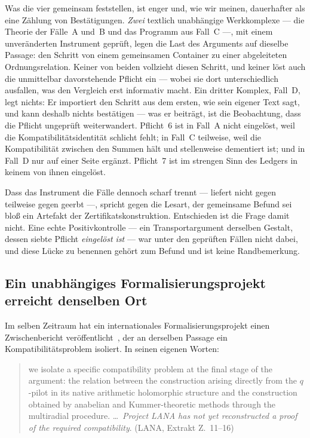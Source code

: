 \documentclass[11pt,a4paper]{article}
\theoremstyle{definition}
\newcommand{\anchor}[2]{(#1, Extrakt Z.~#2)}
\begin{document}
Was die vier gemeinsam feststellen, ist enger und, wie wir meinen, dauerhafter als
eine Zählung von Bestätigungen. \emph{Zwei} textlich unabhängige Werkkomplexe ---
die Theorie der Fälle~A und~B und das Programm aus Fall~C ---, mit einem
unveränderten Instrument geprüft, legen die Last des Arguments auf dieselbe
Passage: den Schritt von einem gemeinsamen Container zu einer abgeleiteten
Ordnungsrelation. Keiner von beiden vollzieht diesen Schritt, und keiner löst auch
die unmittelbar davorstehende Pflicht ein --- wobei sie dort unterschiedlich
ausfallen, was den Vergleich erst informativ macht. Ein dritter Komplex,
Fall~D, legt nichts: Er importiert den Schritt aus dem ersten, wie sein eigener
Text sagt, und kann deshalb nichts bestätigen --- was er beiträgt, ist die
Beobachtung, dass die Pflicht ungeprüft weiterwandert. Pflicht~6 ist in Fall~A
nicht eingelöst, weil die Kompatibilitätsidentität schlicht fehlt; in Fall~C
teilweise, weil die Kompatibilität zwischen den Summen hält und stellenweise
dementiert ist; und in Fall~D nur auf einer Seite ergänzt. Pflicht~7 ist im
strengen Sinn des Ledgers in keinem von ihnen eingelöst.

Dass das Instrument die Fälle dennoch scharf trennt --- \glqq liefert nicht\grqq{} gegen
\glqq teilweise\grqq{} gegen \glqq geerbt\grqq{} ---, spricht gegen die Lesart, der gemeinsame Befund sei
bloß ein Artefakt der Zertifikatskonstruktion. Entschieden ist die Frage damit
nicht. Eine echte Positivkontrolle --- ein Transportargument derselben Gestalt,
dessen siebte Pflicht \emph{eingelöst ist} --- war unter den geprüften Fällen nicht
dabei, und diese Lücke zu benennen gehört zum Befund und ist keine Randbemerkung.

\subsection{Ein unabhängiges Formalisierungsprojekt erreicht denselben Ort}

Im selben Zeitraum hat ein internationales Formalisierungsprojekt einen
Zwischenbericht veröffentlicht~\cite{LANA2026}, der an derselben Passage ein
Kompatibilitätsproblem isoliert. In seinen eigenen Worten:

\begin{quote}\small
\glqq we isolate a specific compatibility problem at the final stage of the argument:
the relation between the construction arising directly from the $q$-pilot in its
native arithmetic holomorphic structure and the construction obtained by anabelian
and Kummer-theoretic methods through the multiradial procedure. \dots\
\emph{Project LANA has not yet reconstructed a proof of the required
compatibility}.\grqq{} \hfill\anchor{LANA}{11--16}
\end{quote}
\end{document}
